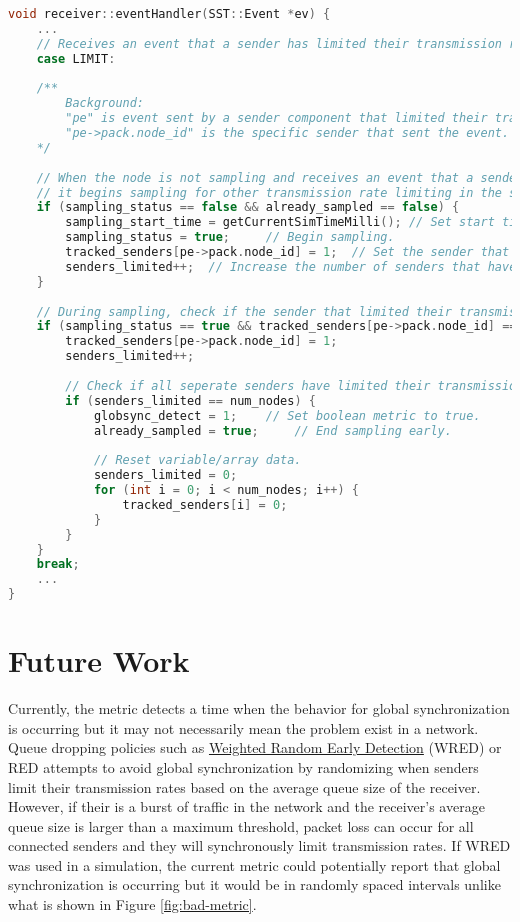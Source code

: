 \documentclass{article}
\begin{document}
\begin{lstlisting}[language=C++, commentstyle=\fontfamily{fve}\selectfont\color{black}]
void receiver::eventHandler(SST::Event *ev) {
	...
	// Receives an event that a sender has limited their transmission rates.
	case LIMIT: 
	
	/** 
		Background: 
		"pe" is event sent by a sender component that limited their transmission rate.
		"pe->pack.node_id" is the specific sender that sent the event.
	*/
	
	// When the node is not sampling and receives an event that a sender is limiting transmission rates,
	// it begins sampling for other transmission rate limiting in the set window time.
	if (sampling_status == false && already_sampled == false) {
		sampling_start_time = getCurrentSimTimeMilli(); // Set start time of sampling.
		sampling_status = true;		// Begin sampling.
		tracked_senders[pe->pack.node_id] = 1;	// Set the sender that caused sampling to begin to
		senders_limited++;	// Increase the number of senders that have limited their transmission rates.
	} 
	
	// During sampling, check if the sender that limited their transmission rate is new, and that sampling has not already ended early (behavior has already been detected in sampling window).
	if (sampling_status == true && tracked_senders[pe->pack.node_id] == 0 && already_sampled == false) {
		tracked_senders[pe->pack.node_id] = 1;
		senders_limited++; 
		
		// Check if all seperate senders have limited their transmission rates in the sampling window time.
		if (senders_limited == num_nodes) {
			globsync_detect = 1;	// Set boolean metric to true.
			already_sampled = true;		// End sampling early.
			
			// Reset variable/array data.
			senders_limited = 0;
			for (int i = 0; i < num_nodes; i++) {
				tracked_senders[i] = 0;
			}
		}
	} 
	break;
	...
}
\end{lstlisting}
													
\section{Future Work}
Currently, the metric detects a time when the behavior for global synchronization is occurring but it may not necessarily mean the problem exist in a network. Queue dropping policies such as \href{https://en.wikipedia.org/wiki/Weighted_random_early_detection}{Weighted Random Early Detection} (WRED) or RED attempts to avoid global synchronization by randomizing when senders limit their transmission rates based on the average queue size of the receiver. However, if their is a burst of traffic in the network and the receiver's average queue size is larger than a maximum threshold, packet loss can occur for all connected senders and they will synchronously limit transmission rates. If WRED was used in a simulation, the current metric could potentially report that global synchronization is occurring but it would be in randomly spaced intervals unlike what is shown in Figure \ref{fig:bad-metric}.
\end{document}
